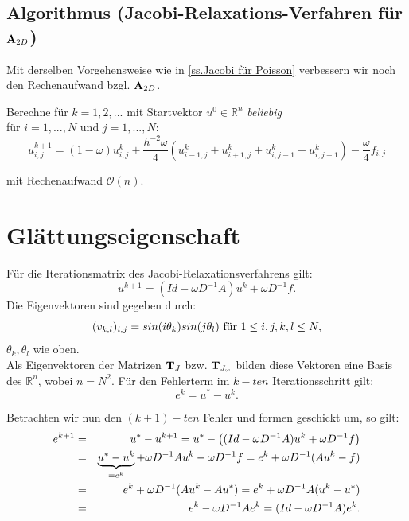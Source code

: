 \subsection{Algorithmus (Jacobi-Relaxations-Verfahren für ${\textbf{A}}_{2D}$)}\label{ss.Algorithmus Jacobi Relax Poisson}

Mit derselben Vorgehensweise wie in \autoref{ss.Jacobi für Poisson} verbessern wir noch den Rechenaufwand bzgl. ${\textbf{A}}_{2D}$.

Berechne für $k = 1,2,...$ mit Startvektor $u^{0} \in \mathbb{R}^{n}$ \textit{beliebig}\\
für $i = 1,...,N$ und $j = 1,...,N$:
\begin{equation}
u^{k+1}_{i,j} = (1 - \omega) u^{k}_{i,j} + \frac{h^{-2} \omega}{4} (u^{k}_{i-1,j} + u^{k}_{i+1,j} + u^{k}_{i,j-1} + u^{k}_{i,j+1}) - \frac{\omega}{4} f_{i,j}
\end{equation}

mit Rechenaufwand $\mathcal{O}(n)$.

\section{Glättungseigenschaft}\label{s.Glättungseigenschaft}

Für die Iterationsmatrix des Jacobi-Relaxationsverfahrens gilt:
\begin{equation}
u^{k+1} = (Id - \omega D^{-1}A)u^{k} + \omega D^{-1}f.
\end{equation}
Die Eigenvektoren sind gegeben durch:
\begin{equation}
(v_{k,l})_{i,j} = sin(i \theta_{k})sin(j \theta_{l}) \textnormal{ für } 1 \le i,j,k,l \le N,
\end{equation}
$\theta_{k}, \theta_{l}$ wie oben.\\
Als Eigenvektoren der Matrizen ${\textbf{T}}_{J}$ bzw. ${\textbf{T}}_{J_{\omega}}$ bilden diese Vektoren eine Basis des $\mathbb{R}^{n}$, wobei $n = N^{2}$.
Für den Fehlerterm im $k-ten$ Iterationsschritt gilt:
\begin{equation}
e^{k} = u^{*} - u^{k}.
\end{equation}

Betrachten wir nun den $(k+1)-ten$ Fehler und formen geschickt um, so gilt:
\begin{eqnarray}
e^{k+1} &=& u^{*} - u^{k+1} = u^{*} - \left( (Id - \omega D^{-1} A)u^{k} + \omega D^{-1}f \right) \notag \\
&=& \underbrace{u^{*} - u^{k}}_{= e^{k}} + \omega D^{-1} A u^{k} - \omega D^{-1}f = e^{k} + \omega D^{-1} (Au^{k} - f) \notag \\
&=& e^{k} + \omega D^{-1} (Au^{k} - Au^{*}) = e^{k} + \omega D^{-1} A(u^{k} - u^{*}) \notag \\
&=& e^{k} - \omega D^{-1} A e^{k} = (Id - \omega D^{-1} A) e^{k}.
\end{eqnarray}

